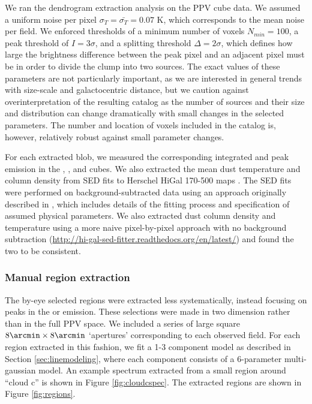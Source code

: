 
We ran the dendrogram extraction analysis on the 
\threeohthree PPV cube data.  We assumed a uniform noise per pixel
$\sigma_{T}=\bar{\sigma_T}=0.07$ K, which corresponds to the mean noise
per field.  We enforced thresholds of a minimum number of
voxels $N_{min}=100$, a peak threshold of $I = 3\sigma$, and a splitting
threshold $\Delta = 2\sigma$, which defines how large the brightness difference
between
the peak pixel and an adjacent pixel must be in order to divide the clump into two
sources.  The exact values of these parameters are not particularly
important, as we are interested in general trends with size-scale and
galactocentric distance, but we caution against overinterpretation of the
resulting catalog as the number of sources and their size and distribution can
change dramatically with small changes in the selected parameters.  The number
and location of voxels included in the catalog is, however, relatively robust
against small parameter changes.

For each extracted blob, we measured the corresponding integrated and peak
emission in the \threeohthree, \threetwoone, and \thirteenco cubes.  We also extracted the mean
dust temperature and column density from SED fits to Herschel HiGal 170-500\um
maps \citep{Molinari2010a,Traficante2011a}.  The SED fits were performed on
background-subtracted data using an approach originally described in
\citet{Battersby2011a}, which includes details of the fitting process and
specification of assumed physical parameters.  We also extracted dust column
density and temperature using a more naive pixel-by-pixel approach with no
background subtraction
(\url{http://hi-gal-sed-fitter.readthedocs.org/en/latest/}) and found the two
to be consistent.

\subsubsection{Manual region extraction}
\label{sec:byeye}
The by-eye selected regions were extracted less systematically, instead
focusing on peaks in the \threeohthree or \threetwoone emission.  These
selections were made in two dimension rather than in the full PPV space.  We
included a series of large square $8\arcmin \times 8\arcmin$ `apertures'
corresponding to each observed field.  For each region extracted in this
fashion, we fit a 1-3 component model as described in Section
\ref{sec:linemodeling}, where each component consists of a 6-parameter
multi-gaussian model.  An example spectrum extracted from a small region around
``cloud c'' is shown in Figure \ref{fig:cloudcspec}.  The extracted regions are
shown in Figure \ref{fig:regions}.

